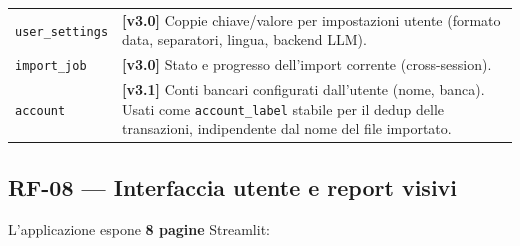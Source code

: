 \documentclass[11pt, a4paper]{article}
\begin{document}
\begin{center}
\begin{tabular}{@{}L{5cm} L{8.5cm}@{}}
\texttt{user\_settings}           & \textbf{[v3.0]} Coppie chiave/valore per impostazioni utente
                                    (formato data, separatori, lingua, backend LLM). \\
\texttt{import\_job}              & \textbf{[v3.0]} Stato e progresso dell'import corrente
                                    (cross-session). \\
\texttt{account}                  & \textbf{[v3.1]} Conti bancari configurati dall'utente
                                    (nome, banca). Usati come \texttt{account\_label}
                                    stabile per il dedup delle transazioni, indipendente
                                    dal nome del file importato. \\
\bottomrule
\end{tabular}
\end{center}

\subsection{RF-08 --- Interfaccia utente e report visivi}

L'applicazione espone \textbf{8 pagine} Streamlit:
\end{document}
